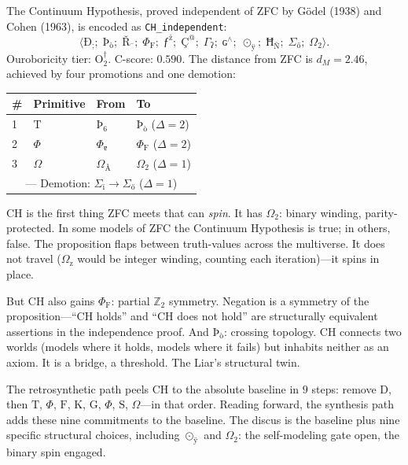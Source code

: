 \documentclass[12pt,twoside]{book}
\theoremstyle{definition}
\newcommand{\prim}[1]{\text{#1}}
\newcommand{\tupledisp}[1]{\langle #1 \rangle}
\newcommand{\tier}[1]{\text{O}_{#1}}
\begin{document}
The Continuum Hypothesis, proved independent of ZFC by G\"odel (1938) and Cohen (1963), is encoded as \texttt{CH\_independent}:
\begin{equation}
\tupledisp{
\text{Ð}_{\text{;}};\;
\text{Þ}_{\text{ò}};\;
\text{Ř}_{\text{¯}};\;
\Phi_{\text{F}};\;
\text{ƒ}^{\text{ż}};\;
\text{Ç}^{\text{@}};\;
\Gamma_{\text{ʔ}};\;
\text{ɢ}^{\land};\;
\odot_{\text{ÿ}};\;
\text{Ħ}_{\text{Ñ}};\;
\Sigma_{\text{ő}};\;
\Omega_{\text{2}}
}.
\end{equation}
Ouroboricity tier: $\tier{2}^{\dagger}$. C-score: $0.590$. The distance from ZFC is $d_M = 2.46$, achieved by four promotions and one demotion:
\begin{center}
\begin{tabular}{llll}
\toprule
\textbf{\#} & \textbf{Primitive} & \textbf{From} & \textbf{To} \\
\midrule
1 & $\prim{T}$ & $\text{Þ}_{\text{6}}$ & $\text{Þ}_{\text{ò}}$ \quad ($\Delta = 2$) \\
2 & $\Phi$ & $\Phi_{\text{ɐ}}$ & $\Phi_{\text{F}}$ \quad ($\Delta = 2$) \\
3 & $\Omega$ & $\Omega_{\text{Å}}$ & $\Omega_{\text{2}}$ \quad ($\Delta = 1$) \\
\multicolumn{4}{c}{--- Demotion: $\Sigma_{\text{ï}} \to \Sigma_{\text{ő}}$ ($\Delta = 1$)} \\
\bottomrule
\end{tabular}
\end{center}

CH is the first thing ZFC meets that can \emph{spin}. It has $\Omega_{\text{2}}$: binary winding, parity-protected. In some models of ZFC the Continuum Hypothesis is true; in others, false. The proposition flaps between truth-values across the multiverse. It does not travel ($\Omega_{\text{z}}$ would be integer winding, counting each iteration)---it spins in place.

But CH also gains $\Phi_{\text{F}}$: partial $\mathbb{Z}_2$ symmetry. Negation is a symmetry of the proposition---``CH holds'' and ``CH does not hold'' are structurally equivalent assertions in the independence proof. And $\text{Þ}_{\text{ò}}$: crossing topology. CH connects two worlds (models where it holds, models where it fails) but inhabits neither as an axiom. It is a bridge, a threshold. The Liar's structural twin.

The retrosynthetic path peels CH to the absolute baseline in $9$ steps: remove $\prim{D}$, then $\prim{T}$, $\Phi$, $\prim{F}$, $\prim{K}$, $\prim{G}$, $\Phi$, $\prim{S}$, $\Omega$---in that order. Reading forward, the synthesis path adds these nine commitments to the baseline. The discus is the baseline plus nine specific structural choices, including $\odot_{\text{ÿ}}$ and $\Omega_{\text{2}}$: the self-modeling gate open, the binary spin engaged.
\end{document}
